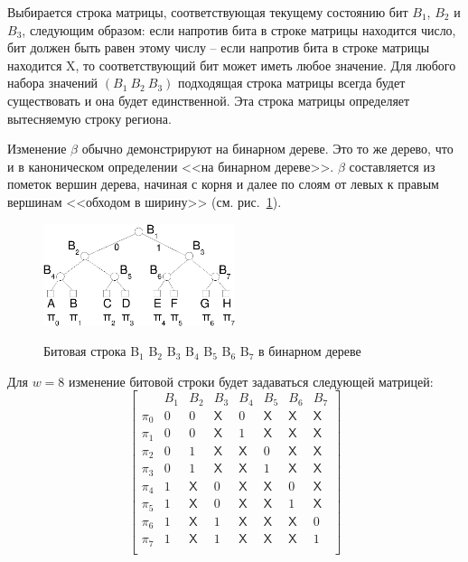 Выбирается строка матрицы, соответствующая текущему состоянию бит $B_1$,
$B_2$ и $B_3$, следующим образом: если напротив бита в строке матрицы находится число, бит
должен быть равен этому числу -- если напротив бита в строке матрицы
находится \textsf{X}, то соответствующий бит может иметь любое значение. Для любого набора значений $(B_1~B_2~B_3)$ подходящая строка матрицы всегда будет существовать и она будет единственной. Эта строка матрицы определяет вытесняемую строку региона.

Изменение $\beta$ обычно демонстрируют на бинарном дереве. Это то же дерево, что и в каноническом определении \PseudoLRU <<на бинарном дереве>>. $\beta$ составляется из пометок вершин дерева, начиная с корня и далее по слоям от левых к правым вершинам <<обходом в ширину>> (см. рис.~\ref{plru_bittree}).

\begin{figure}[h] \center
  \includegraphics[width=0.5\textwidth]{2.theor/plru}\\
  \caption{Битовая строка B$_1$ B$_2$ B$_3$ B$_4$ B$_5$ B$_6$ B$_7$  в бинарном дереве}\label{plru_bittree}
\end{figure}

Для $w=8$ изменение битовой строки будет задаваться следующей матрицей:
$$
\left[
  \begin{array}{c|ccccccc}
          & B_1 & B_2 & B_3 & B_4 & B_5 & B_6 & B_7 \\ \hline
    \pi_0 & 0 & 0 & \textsf{X} & 0 & \textsf{X} & \textsf{X} & \textsf{X} \\
    \pi_1 & 0 & 0 & \textsf{X} & 1 & \textsf{X} & \textsf{X} & \textsf{X} \\
    \pi_2 & 0 & 1 & \textsf{X} & \textsf{X} & 0 & \textsf{X} & \textsf{X} \\
    \pi_3 & 0 & 1 & \textsf{X} & \textsf{X} & 1 & \textsf{X} & \textsf{X} \\
    \pi_4 & 1 & \textsf{X} & 0 & \textsf{X} & \textsf{X} & 0 & \textsf{X} \\
    \pi_5 & 1 & \textsf{X} & 0 & \textsf{X} & \textsf{X} & 1 & \textsf{X} \\
    \pi_6 & 1 & \textsf{X} & 1 & \textsf{X} & \textsf{X} & \textsf{X} & 0 \\
    \pi_7 & 1 & \textsf{X} & 1 & \textsf{X} & \textsf{X} & \textsf{X} & 1 \\
  \end{array}
\right]
$$

